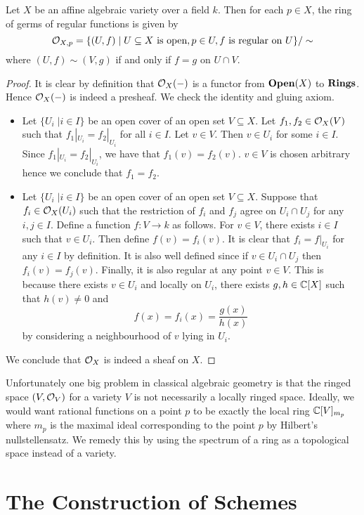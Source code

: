 \documentclass[a4paper]{article}
\begin{document}
\begin{lmm}{}{} Let $X$ be an affine algebraic variety over a field $k$. Then for each $p\in X$, the ring of germs of regular functions is given by $$\mathcal{O}_{X,p}=\{(U,f)\;|\;U\subseteq X\text{ is open}, p\in U, f\text{ is regular on }U\}/\sim$$ where $(U,f)\sim(V,g)$ if and only if $f=g$ on $U\cap V$. \tcbline
\begin{proof}
It is clear by definition that $\mathcal{O}_X(-)$ is a functor from $\bold{Open}(X)$ to $\bold{Rings}$. Hence $\mathcal{O}_X(-)$ is indeed a presheaf. We check the identity and gluing axiom. 
\begin{itemize}
\item Let $\{U_i\;|i\in I\}$ be an open cover of an open set $V\subseteq X$. Let $f_1,f_2\in\mathcal{O}_X(V)$ such that $f_1|_{U_i}=f_2|_{U_i}$ for all $i\in I$. Let $v\in V$. Then $v\in U_i$ for some $i\in I$. Since $f_1|_{U_i}=f_2|_{U_i}$, we have that $f_1(v)=f_2(v)$. $v\in V$ is chosen arbitrary hence we conclude that $f_1=f_2$. 
\item Let $\{U_i\;|i\in I\}$ be an open cover of an open set $V\subseteq X$. Suppose that $f_i\in\mathcal{O}_X(U_i)$ such that the restriction of $f_i$ and $f_j$ agree on $U_i\cap U_j$ for any $i,j\in I$. Define a function $f:V\to k$ as follows. For $v\in V$, there exists $i\in I$ such that $v\in U_i$. Then define $f(v)=f_i(v)$. It is clear that $f_i=f|_{U_i}$ for any $i\in I$ by definition. It is also well defined since if $v\in U_i\cap U_j$ then $f_i(v)=f_j(v)$. Finally, it is also regular at any point $v\in V$. This is because there exists $v\in U_i$ and locally on $U_i$, there exists $g,h\in\mathbb{C}[X]$ such that $h(v)\neq 0$ and $$f(x)=f_i(x)=\frac{g(x)}{h(x)}$$ by considering a neighbourhood of $v$ lying in $U_i$. 
\end{itemize}
We conclude that $\mathcal{O}_X$ is indeed a sheaf on $X$. 
\end{proof}
\end{lmm}

Unfortunately one big problem in classical algebraic geometry is that the ringed space $(V,\mathcal{O}_V)$ for a variety $V$ is not necessarily a locally ringed space. Ideally, we would want rational functions on a point $p$ to be exactly the local ring $\mathbb{C}[V]_{m_p}$ where $m_p$ is the maximal ideal corresponding to the point $p$ by Hilbert's nullstellensatz. We remedy this by using the spectrum of a ring as a topological space instead of a variety. 

\pagebreak
\section{The Construction of Schemes}
\end{document}
